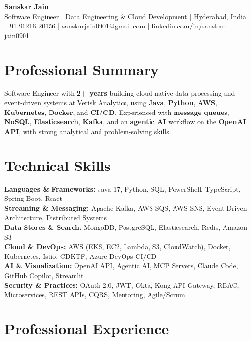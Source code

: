 \documentclass[a4paper,10pt]{article}
\begin{document}
\begin{center}
    {\LARGE \textbf{Sanskar Jain}} \\
    \vspace{2pt}
    Software Engineer \;|\; Data Engineering \& Cloud Development \;|\; Hyderabad, India \\
    \href{tel:+919021620156}{+91 90216 20156} \;|\;
    \href{mailto:sanskarjain0901@gmail.com}{sanskarjain0901@gmail.com} \;|\;
    \href{https://www.linkedin.com/in/sanskar-jain0901/}{linkedin.com/in/sanskar-jain0901}
\end{center}

\section*{Professional Summary}
Software Engineer with \textbf{2+ years} building cloud-native data-processing and event-driven systems at Verisk Analytics, using \textbf{Java}, \textbf{Python}, \textbf{AWS}, \textbf{Kubernetes}, \textbf{Docker}, and \textbf{CI/CD}.
Experienced with \textbf{message queues}, \textbf{NoSQL}, \textbf{Elasticsearch}, \textbf{Kafka}, and an \textbf{agentic AI} workflow on the \textbf{OpenAI API}, with strong analytical and problem-solving skills.

\section*{Technical Skills}
\begin{sloppypar}
\noindent
\textbf{Languages \& Frameworks:} Java 17, Python, SQL, PowerShell, TypeScript, Spring Boot, React \\
\textbf{Streaming \& Messaging:} Apache Kafka, AWS SQS, AWS SNS, Event-Driven Architecture, Distributed Systems \\
\textbf{Data Stores \& Search:} MongoDB, PostgreSQL, Elasticsearch, Redis, Amazon S3 \\
\textbf{Cloud \& DevOps:} AWS (EKS, EC2, Lambda, S3, CloudWatch), Docker, Kubernetes, Istio, CDKTF, Azure DevOps CI/CD \\
\textbf{AI \& Visualization:} OpenAI API, Agentic AI, MCP Servers, Claude Code, GitHub Copilot, Streamlit \\
\textbf{Security \& Practices:} OAuth 2.0, JWT, Okta, Kong API Gateway, RBAC, Microservices, REST APIs, CQRS, Mentoring, Agile/Scrum
\end{sloppypar}

\section*{Professional Experience}
\end{document}
